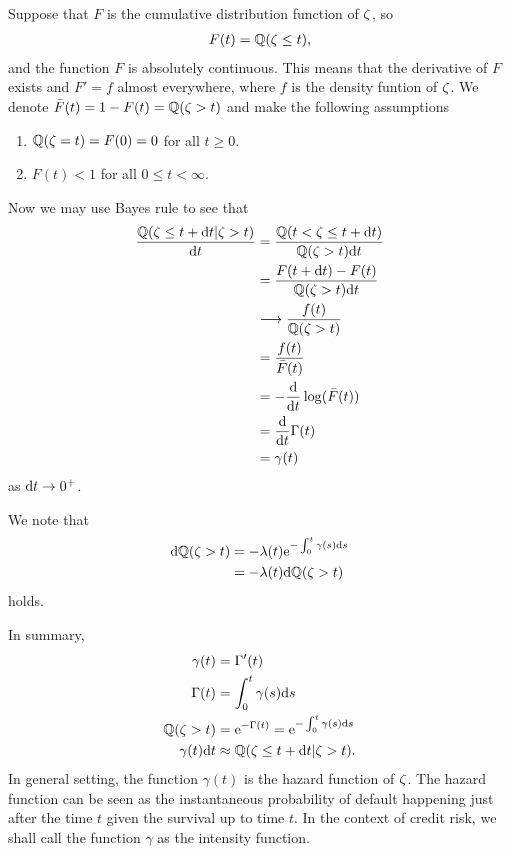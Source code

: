 Suppose that $F$ is the cumulative distribution function of $\zeta$, so
  \begin{align}
    F(t) = \mathbb{Q} ( \zeta \leq t ),
  \end{align}
and the function $F$ is absolutely continuous. This means that the derivative of $F$ exists and $F' = f$ almost everywhere, where $f$ is the density funtion of $\zeta$. We denote $\bar{F} (t) = 1 - F (t) = \mathbb{Q} ( \zeta > t )$ and make the following assumptions
  \begin{enumerate}[labelindent=\parindent, leftmargin=*, label*=(\Alph*)]
    \item $\mathbb{Q} ( \zeta = t ) = F ( 0 ) = 0$ for all $t \geq 0$. \label{intensityassumptionA}
    \item $F (t) < 1$ for all $0 \leq t < \infty$. \label{intensityassumptionB}
  \end{enumerate}
Now we may use Bayes rule to see that
\begin{align}
     \frac{\mathbb{Q} (\zeta \leq t + \mathrm{d} t | \zeta > t)}{\mathrm{d} t} &= \frac{\mathbb{Q} (t < \zeta \leq t + \mathrm{d} t)}{ \mathbb{Q} (\zeta > t) \mathrm{d} t } \\ 
     &=  \frac{F(t+\mathrm{d} t)-F(t)}{ \mathbb{Q} (\zeta > t) \mathrm{d} t } \\
     &\longrightarrow \frac{f(t)}{\mathbb{Q} (\zeta > t)} \\
     &= \frac{f(t)}{\bar{F} (t)} \\
     &= - \frac{\mathrm{d}}{\mathrm{d} t} \log ( \bar{F} (t) ) \\
     &= \frac{\mathrm{d}}{\mathrm{d} t} \Gamma(t) \\
     &= \gamma(t)
  \end{align}
as $\mathrm{d} t \rightarrow 0^+$.

We note that
	\begin{align}
		\mathrm{d} \mathbb{Q} ( \zeta > t ) &= - \lambda (t) \mathrm{e}^{ - \int_0^t \gamma (s)  \mathrm{d} s } \\
			&= - \lambda (t) \mathrm{d} \mathbb{Q} ( \zeta > t )
	\end{align}
holds.

In summary,
  \begin{align}
    \gamma (t) &= \Gamma' (t) \\
    \Gamma (t) &= \int_0^t \gamma (s) \mathrm{d} s \\
    \mathbb{Q} ( \zeta > t ) &= \mathrm{e}^{- \Gamma (t) } = \mathrm{e}^{ - \int_0^t \gamma (s)  \mathrm{d} s } \\
    \gamma (t) \mathrm{d} t &\approx \mathbb{Q} (\zeta \leq t + \mathrm{d} t | \zeta > t) .
  \end{align}
In general setting, the function $\gamma(t)$ is the hazard function of $\zeta$. The hazard function can be seen as the instantaneous probability of default happening just after the time $t$ given the survival up to time $t$. In the context of credit risk, we shall call the function $\gamma$ as the intensity function.

